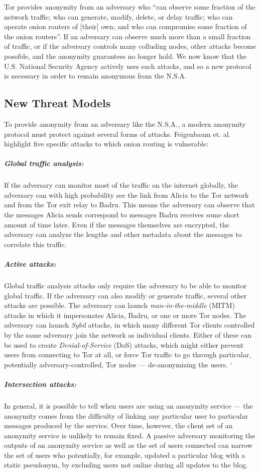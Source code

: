     Tor provides anonymity from an adversary who ``can observe some fraction of
    the network traffic; who can generate, modify, delete, or delay traffic; who
    can operate onion routers of [their] own; and who can compromise some
    fraction of the onion routers''\cite{dingledine_tor:_2004}. If an adversary
    can observe much more than a small fraction of traffic, or if the adversary
    controls many colluding nodes, other attacks become possible, and the
    anonymity guarantees no longer hold. We now know that the U.S. National
    Security Agency actively uses such attacks, and so a new protocol is
    necessary in order to remain anonymous from the N.S.A.

  \subsection{New Threat Models}
  \label{Subsection:NewThreats} To
    provide anonymity from an adversary like the N.S.A., a modern anonymity
    protocol must protect against several forms of attacks. Feigenbaum et.
    al.\cite{feigenbaum_seeking_2013} highlight five specific attacks to which
    onion routing is vulnerable:
    \subparagraph{Global traffic analysis:} If the
    adversary can monitor most of the traffic on the internet globally, the
    adversary can with high probability see the link from Alicia to the Tor
    network and from the Tor exit relay to Badru. This means the adversary can
    observe that the messages Alicia sends correspond to messages Badru receives
    some short amount of time later. Even if the messages themselves are
    encrypted, the adversary can analyze the lengths and other metadata about
    the messages to correlate this traffic.
    \subparagraph{Active attacks:}
    Global traffic analysis attacks only require the adversary to be able to
    monitor global traffic. If the adversary can also modify or generate
    traffic, several other attacks are possible. The adversary can launch
    \emph{man-in-the-middle} (MITM) attacks in which it impersonates Alicia,
    Badru, or one or more Tor nodes. The adversary can launch \emph{Sybil}
    attacks, in which many different Tor clients controlled by the same
    adversary join the network as individual clients. Either of these can be
    used to create \emph{Denial-of-Service} (DoS) attacks, which might either
    prevent users from connecting to Tor at all, or force Tor traffic to go
    through particular, potentially adversary-controlled, Tor nodes ---
    de-anonymizing the users.
    `\subparagraph{Intersection attacks:} In general,
    it is possible to tell when users are using an anonymity service --- the
    anonymity comes from the difficulty of linking any particular user to
    particular messages produced by the service. Over time, however, the client
    set of an anonymity service is unlikely to remain fixed. A passive
    adversary monitoring the outputs of an anonymity service as well as
    the set of users connected can narrow the set of users who
    potentially, for example, updated a particular blog with a static
    pseudonym, by excluding users  not online during all updates to the
    blog.

